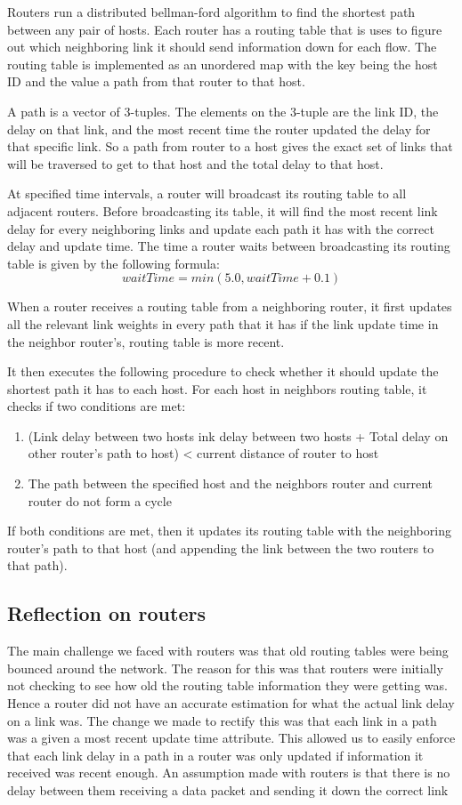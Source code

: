 \documentclass[12pt]{article}
\begin{document}
Routers run a distributed bellman-ford algorithm to find the shortest path between any pair of hosts. Each router has a routing table that is uses to figure out which neighboring link it should send information down for each flow. The routing table is implemented as an unordered map with the key being the host ID and the value a path from that router to that host.
 
A path is a vector of 3-tuples. The elements on the 3-tuple are the link ID, the delay on that link, and the most recent time the router updated the delay for that specific link. So a path from router to a host gives the exact set of links that will be traversed to get to that host and the total delay to that host.
 
At specified time intervals, a router will broadcast its routing table to all adjacent routers. Before broadcasting its table, it will find the most recent link delay for every neighboring links and update each path it has with the correct delay and update time. The time a router waits between broadcasting its routing table is given by the following formula: 
$$waitTime = min(5.0, waitTime + 0.1)$$

When a router receives a routing table from a neighboring router, it first updates all the relevant link weights in every path that it has if the link update time in the neighbor router’s, routing table is more recent.

It then executes the following procedure to check whether it should update the shortest path it has to each host. For each host in neighbors routing table, it checks if two conditions are met:
\begin{enumerate}
\item (Link delay between two hosts ink delay between two hosts + Total delay on other router’s path to host) < current distance of router to host
\item The path between the specified host and the neighbors router and current router do not form a cycle
\end{enumerate}
If both conditions are met, then it updates its routing table with the neighboring router’s path to that host (and appending the link between the two routers to that path).


\subsection*{Reflection on routers}
 
The main challenge we faced with routers was that old routing tables were being bounced around the network. The reason for this was that routers were initially not checking to see how old the routing table information they were getting was. Hence a router did not have an accurate estimation for what the actual link delay on a link was. The change we made to rectify this was that each link in a path was a given a most recent update time attribute. This allowed us to easily enforce that each link delay in a path in a router was only updated if information it received was recent enough. An assumption made with routers is that there is no delay between them receiving a data packet and sending it down the correct link
\end{document}
